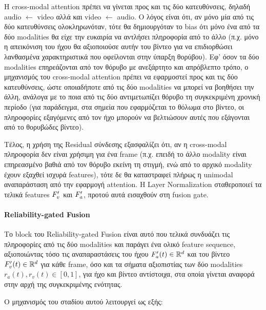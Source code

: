 Η cross-modal attention πρέπει να γίνεται προς και τις δύο κατευθύνσεις, δηλαδή audio $\leftarrow$ video αλλά και video $\leftarrow$ audio. Ο λόγος είναι ότι, αν μόνο μία από τις δύο κατευθύνσεις ολοκληρωνόταν, τότε θα δημιουργόταν το bias ότι μόνο ένα από τα δύο modalities θα είχε την ευκαιρία να αντλήσει πληροφορία από το άλλο (π.χ. μόνο η απεικόνιση του ήχου θα αξιοποιούσε αυτήν του βίντεο για να επιδιορθώσει λανθασμένα χαρακτηριστικά που οφείλονται στην ύπαρξη θορύβου). Εφ' όσον τα δύο modalities επηρεάζονται από τον θόρυβο με ανεξάρτητο και απρόβλεπτο τρόπο, ο μηχανισμός του cross-modal attention πρέπει να εφαρμοστεί προς και τις δύο κατευθύνσεις, ώστε οποιαδήποτε από τις δύο modalities να μπορεί να βοηθήσει την άλλη, ανάλογα με το ποια από τις δύο αντιμετωπίζει θόρυβο τη συγκεκριμένη χρονική περίοδο (για παράδειγμα, στα σημεία που εφαρμόζεται το θόλωμα στο βίντεο, οι πληροφορίες εξαγόμενες από τον ήχο μπορούν να βελτιώσουν αυτές που εξάγονται από το θορυβώδες βίντεο).

Τέλος, η χρήση της Residual σύνδεσης εξασφαλίζει ότι, αν η cross-modal πληροφορία δεν είναι χρήσιμη για ένα frame (π.χ. επειδή το άλλο modality είναι επηρεασμένο βαθιά από τον θόρυβο εκείνη τη στιγμή, ενώ από το αρχικό modality έχουν εξαχθεί ισχυρά features), τότε δε θα καταστραφεί πλήρως η unimodal αναπαράσταση από την εφαρμογή attention. Η Layer Normalization σταθεροποιεί τα τελικά features $F_v\sp{\prime}$ και $F_a\sp{\prime}$, προτού αυτά εισαχθούν στη fusion gate.

\paragraph{Reliability-gated Fusion}
Το block του Reliability-gated Fusion είναι αυτό που τελικά συνδυάζει τις πληροφορίες από τις δύο modalities και παράγει ένα ολικό feature sequence, αξιοποιώντας τόσο τις αναπαραστάσεις του ήχου $F_a\sp{\prime}(t) \in \mathbb{R}^d$ και του βίντεο $F_v\sp{\prime}(t) \in \mathbb{R}^d$ για κάθε frame, όσο και τα σήματα αξιοπιστίας των δύο modalities $r_a(t), r_v(t) \in [0,1]$, για ήχο και βίντεο αντίστοιχα, στα οποία γίνεται αναφορά στην αρχή της συγκεκριμένης ενότητας.

Ο μηχανισμός του σταδίου αυτού λειτουργεί ως εξής:

